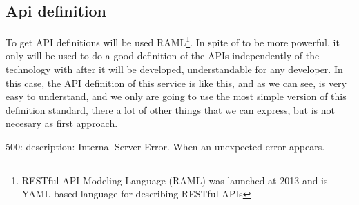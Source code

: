 \subsection{Api definition}

To get API definitions will be used  RAML\footnote{ RESTful API Modeling Language
(RAML) was launched at 2013 and is YAML based language for describing RESTful APIs }.
In spite of to be more powerful, it only will be used to do a good definition of the
APIs independently of the technology with after it will be developed, understandable
for any developer.
\intro
In this case, the API definition of this service is like this, and as we can see,
is very easy to understand, and we only are going to use the most simple
version of this definition standard, there a lot of other things that we can
express, but is not necesary as first approach.

500:
  description: Internal Server Error. When an unexpected error appears.

